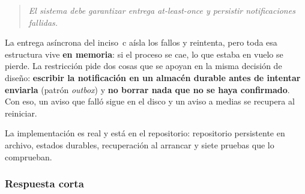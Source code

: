 
\begin{quote}
\itshape
El sistema debe garantizar entrega \emph{at-least-once} y persistir notificaciones fallidas.
\end{quote}

La entrega asíncrona del inciso~c aísla los fallos y reintenta, pero toda esa estructura vive
\textbf{en memoria}: si el proceso se cae, lo que estaba en vuelo se pierde. La restricción pide
dos cosas que se apoyan en la misma decisión de diseño: \textbf{escribir la notificación en un
almacén durable antes de intentar enviarla} (patrón \emph{outbox}) y \textbf{no borrar nada que
no se haya confirmado}. Con eso, un aviso que falló sigue en el disco y un aviso a medias se
recupera al reiniciar.

La implementación es real y está en el repositorio: repositorio persistente en archivo, estados
durables, recuperación al arrancar y siete pruebas que lo comprueban.

\subsubsection{Respuesta corta}

